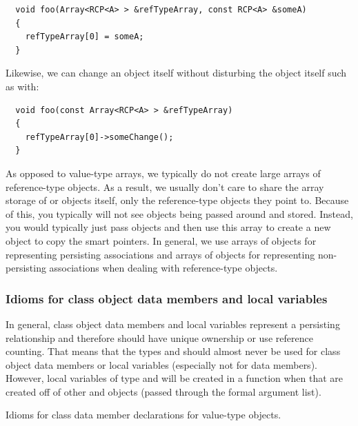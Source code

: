 \documentclass[pdf,ps2pdf,11pt]{SANDreport}
\begin{document}
{\small\begin{verbatim}
  void foo(Array<RCP<A> > &refTypeArray, const RCP<A> &someA)
  {
    refTypeArray[0] = someA;
  }
\end{verbatim}}

Likewise, we can change an {} object itself without
disturbing the {} object itself such as with:

{\small\begin{verbatim}
  void foo(const Array<RCP<A> > &refTypeArray)
  {
    refTypeArray[0]->someChange();
  }
\end{verbatim}}

As opposed to value-type arrays, we typically do not create large
arrays of reference-type objects.  As a result, we usually don't care
to share the array storage of {} or {} objects
itself, only the reference-type objects they point to.  Because of
this, you typically will not see {} objects being passed around and stored.  Instead,
you would typically just pass {} objects and then use this array to create a new
{} object to copy the smart
pointers.  In general, we use arrays of {} objects for
representing persisting associations and arrays of {}
objects for representing non-persisting associations when dealing with
reference-type objects.


%
{}\subsubsection{Idioms for class object data members and local
variables}
%

In general, class object data members and local variables represent a
persisting relationship and therefore should have unique ownership or
use reference counting.  That means that the types {} and
{} should almost never be used for class object data
members or local variables (especially not for data members).
However, local variables of type {} and
{} will be created in a function when that are
created off of other {} and {} objects
(passed through the formal argument list).

\begin{table}
%
\begin{center}
%
%

%
%
\end{center}
\caption{\label{fig:data_member_value_type}
Idioms for class data member declarations for value-type objects.}
%
\end{table}
\end{document}
